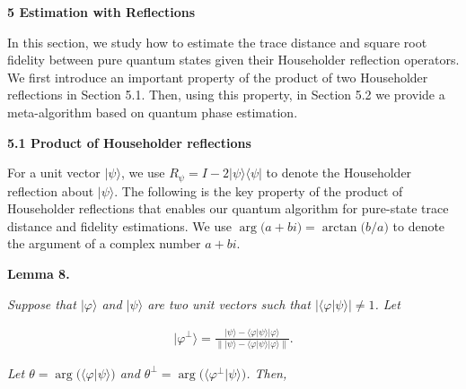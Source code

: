 




\par\medskip\noindent\textbf{
5 Estimation with Reflections}\par




In this section, we study how to estimate the trace distance and square root fidelity between pure quantum states given their Householder reflection operators.
We first introduce an important property of the product of two Householder reflections in Section 5.1.
Then, using this property, in Section 5.2 we provide a meta-algorithm based on quantum phase estimation.\par




\par\medskip\noindent\textbf{
5.1 Product of Householder reflections}\par




For a unit vector $\lvert\psi\rangle$, we use $R_{\psi}=I-2\lvert\psi\rangle\!\langle\psi\rvert$ to denote the Householder reflection about $\lvert\psi\rangle$.
The following is the key property of the product of Householder reflections that enables our quantum algorithm for pure-state trace distance and fidelity estimations.
We use $\arg\lparen a+bi\rparen=\arctan\lparen b/a\rparen$ to denote the argument of a complex number $a+bi$.\par





\par\medskip\noindent\textbf{
\textbf{Lemma 8}\textbf{.}
}\par



\emph{Suppose that $\lvert\varphi\rangle$ and $\lvert\psi\rangle$ are two unit vectors such that $\big\lvert\langle\varphi|\psi\rangle\big\rvert\neq 1$.
Let}\par


\[\begin{gathered}
\lvert\varphi^{\perp}\rangle=\frac{\lvert\psi\rangle-\langle\varphi|\psi\rangle\lvert\varphi\rangle}{\left\lVert\lvert\psi\rangle-\langle\varphi|\psi\rangle\lvert\varphi\rangle\right\rVert}.
\end{gathered}\]


\emph{Let $\theta=\arg\lparen\langle\varphi|\psi\rangle\rparen$ and $\theta^{\perp}=\arg\lparen\langle\varphi^{\perp}|\psi\rangle\rparen$.
Then,}\par


